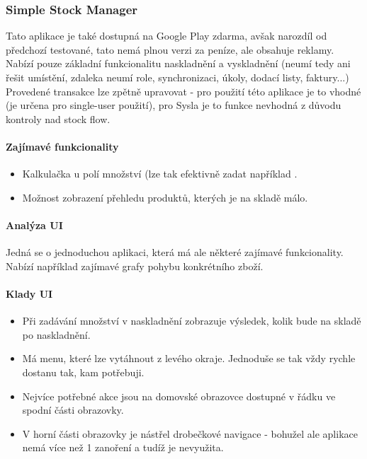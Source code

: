 
\subsubsection{Simple Stock Manager}

Tato aplikace je také dostupná na Google Play zdarma, avšak narozdíl od předchozí testované, tato nemá plnou verzi za peníze, ale obsahuje reklamy.\\
Nabízí pouze základní funkcionalitu naskladnění a vyskladnění (neumí tedy ani řešit umístění, zdaleka neumí role, synchronizaci, úkoly, dodací listy, faktury...)\\
Provedené transakce lze zpětně upravovat - pro použití této aplikace je to vhodné (je určena pro single-user použití), pro Sysla je to funkce nevhodná z důvodu kontroly nad stock flow.

\paragraph{Zajímavé funkcionality}
\begin{itemize}
	\item Kalkulačka u polí množství (lze tak efektivně zadat například .
	\item Možnost zobrazení přehledu produktů, kterých je na skladě málo.
\end{itemize}

\paragraph{Analýza UI}
Jedná se o jednoduchou aplikaci, která má ale některé zajímavé funkcionality.\\
Nabízí například zajímavé grafy pohybu konkrétního zboží.

\paragraph{Klady UI}
\begin{itemize}
	\item Při zadávání množství v naskladnění zobrazuje výsledek, kolik bude na skladě po naskladnění.
	\item Má menu, které lze vytáhnout z levého okraje. Jednoduše se tak vždy rychle dostanu tak, kam potřebuji.
	\item Nejvíce potřebné akce jsou na domovské obrazovce dostupné v řádku ve spodní části obrazovky.
	\item V horní části obrazovky je nástřel drobečkové navigace - bohužel ale aplikace nemá více než 1 zanoření a tudíž je nevyužita.
\end{itemize}


